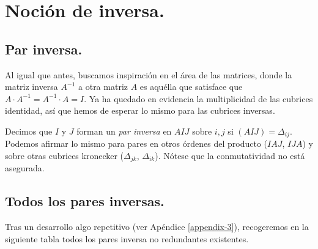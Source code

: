 \section{Noción de inversa.} \label{inverse}

\subsection{Par inversa.} \label{inverse-pair}

Al igual que antes, buscamos inspiración en el área de las matrices, donde la matriz inversa $A^{-1}$ a otra matriz $A$ es aquélla que satisface que ${A\cdot A^{-1} = A^{-1} \cdot A = I}$. Ya ha quedado en evidencia la multiplicidad de las cubrices identidad, así que hemos de esperar lo mismo para las cubrices inversas.

Decimos que $I$ y $J$ forman un \textit{par inversa} en $AIJ$ sobre $i, j$ si $(AIJ) = \Delta_{ij}$. Podemos afirmar lo mismo para pares en otros órdenes del producto ($IAJ$, $IJA$) y sobre otras cubrices kronecker ($\Delta_{jk}$, $\Delta_{ik}$). Nótese que la conmutatividad no está asegurada.

\subsection{Todos los pares inversas.} \label{inverse-all-pairs}

Tras un desarrollo algo repetitivo (ver Apéndice \ref{appendix-3}), recogeremos en la siguiente tabla todos los pares inversa no redundantes existentes.

